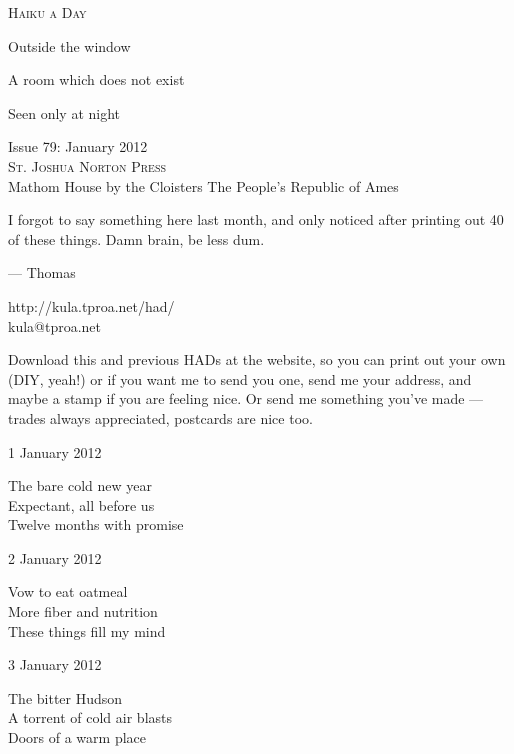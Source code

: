 \documentclass[12pt]{article}
\begin{document}
\begin{center}
{\fontsize{36}{48}\selectfont \textsc{Haiku a Day }}
\end{center}

\vspace*{3.5cm}

{\fontsize{20}{40}\selectfont 

Outside the window

A room which does not exist

Seen only at night


}

\vspace*{5.0cm}
\begin{center}
{\large{Issue 79: January 2012}} \\[5mm]
{\fontsize{8}{8}\selectfont  \textsc{ St. Joshua Norton Press }} \\[1mm]
{\fontsize{6}{6}\selectfont Mathom House by the Cloisters \textbar The People's Republic of Ames }
\end{center}


\newpage

I forgot to say something here last month, and only noticed
after printing out 40 of these things. Damn brain, be less
dum.

--- Thomas

http://kula.tproa.net/had/ \\
kula@tproa.net

Download this and previous HADs at the website, so you can
print out your own (DIY, yeah!) or if you want me to send
you one, send me your address, and maybe a stamp if you
are feeling nice. Or send me something you've made ---
trades always appreciated, postcards are nice too.

\vfill

1 January 2012

The bare cold new year \\
Expectant, all before us \\
Twelve months with promise

2 January 2012

Vow to eat oatmeal \\
More fiber and nutrition \\
These things fill my mind

3 January 2012

The bitter Hudson \\
A torrent of cold air blasts \\
Doors of a warm place
\end{document}
